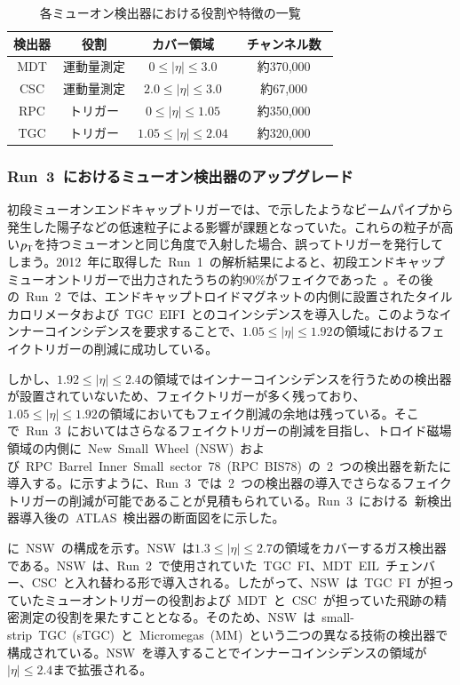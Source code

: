 \begin{table}[tb]
	\centering
	\begin{tabular}{c|ccc}\hline
	    検出器 & 役割 & カバー領域 & チャンネル数　\\ \hline\hline
		MDT & 運動量測定 & $0{\leq}|\eta|{\leq}3.0$ & 約370,000 \\ 
		CSC & 運動量測定 & $2.0{\leq}|\eta|{\leq}3.0$ & 約67,000 \\
        RPC & トリガー & $0{\leq}|\eta|{\leq}1.05$ & 約350,000 \\
        TGC & トリガー & $1.05{\leq}|\eta|{\leq}2.04$ & 約320,000 \\ \hline 
	\end{tabular}
	\caption{各ミューオン検出器における役割や特徴の一覧}
    \label{tb:muon}
\end{table}

\subsubsection{Run~3~におけるミューオン検出器のアップグレード}
初段ミューオンエンドキャップトリガーでは、で示したようなビームパイプから発生した陽子などの低速粒子による影響が課題となっていた。これらの粒子が高い$p_{\rm{T}}$を持つミューオンと同じ角度で入射した場合、誤ってトリガーを発行してしまう。2012~年に取得した~Run~1~の解析結果によると、初段エンドキャップミューオントリガーで出力されたうちの約$90\%$がフェイクであった~\cite{TR:05}。その後の~Run~2~では、エンドキャップトロイドマグネットの内側に設置されたタイルカロリメータおよび~TGC~EIFI~とのコインシデンスを導入した。このようなインナーコインシデンスを要求することで、$1.05{\leq}|\eta|{\leq}1.92$の領域におけるフェイクトリガーの削減に成功している。

しかし、$1.92{\leq}|\eta|{\leq}2.4$の領域ではインナーコインシデンスを行うための検出器が設置されていないため、フェイクトリガーが多く残っており、$1.05{\leq}|\eta|{\leq}1.92$の領域においてもフェイク削減の余地は残っている。そこで~Run~3~においてはさらなるフェイクトリガーの削減を目指し、トロイド磁場領域の内側に~New~Small~Wheel~(NSW)~および~RPC~Barrel~Inner~Small~sector~78~(RPC~BIS78)~の~2~つの検出器を新たに導入する。に示すように、Run~3~では~2~つの検出器の導入でさらなるフェイクトリガーの削減が可能であることが見積もられている。Run~3~における~新検出器導入後の~ATLAS~検出器の断面図をに示した。

に~NSW~の構成を示す。NSW~は$1.3{\leq}|\eta|{\leq}2.7$の領域をカバーするガス検出器である。NSW~は、Run~2~で使用されていた~TGC~FI、MDT~EIL~チェンバー、CSC~と入れ替わる形で導入される。したがって、NSW~は~TGC~FI~が担っていたミューオントリガーの役割および~MDT~と~CSC~が担っていた飛跡の精密測定の役割を果たすこととなる。そのため、NSW~は~small-strip~TGC~(sTGC)~と~Micromegas~(MM)~という二つの異なる技術の検出器で構成されている。NSW~を導入することでインナーコインシデンスの領域が$|\eta|{\leq}2.4$まで拡張される。

